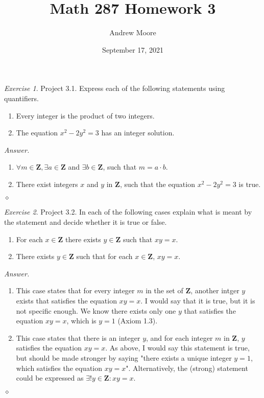 \documentclass[12pt,oneside]{amsart}
\title{Math 287 Homework 3}
\author{Andrew Moore}
\date{September 17, 2021} %
\theoremstyle{remark}
\newtheorem{exer}{Exercise}
\newcommand{\bfZ}{\mathbf{Z}}
\newenvironment{answer}{\bigskip\noindent\emph{Answer.}}{\hfill$\diamond$\newline}
\begin{document}
\maketitle

%
%
%
%

\newpage
\begin{exer}
Project 3.1. Express each of the following statements using quantifiers.
\begin{enumerate}[label={(\roman*)},start={3}]
\item Every integer is the product of two integers.
\item The equation $x^2-2y^2 = 3$ has an integer solution.
\end{enumerate}
\end{exer}

\begin{answer}
\begin{enumerate}[label={(\roman*)},start={3}]
\item $\forall m \in \bfZ, \exists a \in \bfZ$ and $\exists b \in \bfZ$, such that $m = a \cdot b$.
\item There exist integers $x$ and $y$ in $\bfZ$, such that the equation $x^2 - 2y^2 = 3$ is true.
\end{enumerate}
\end{answer}

%
%
%
%

\newpage
\begin{exer}
Project 3.2. In each of the following cases explain what is meant by the statement and decide whether it is true or false.
\begin{enumerate}[label={(\roman*)},start={3}]
\item For each $x \in \mathbf{Z}$ there exists $y \in \mathbf{Z}$ such that $xy=x$.
\item There exists $y \in \mathbf{Z}$ such that for each $x \in \mathbf{Z}$, $xy=x$.
\end{enumerate}
\end{exer}

\begin{answer}
\begin{enumerate}[label={(\roman*)},start={3}]
\item This case states that for every integer $m$ in the set of $\bfZ$, another intger $y$ exists that satisfies the equation $xy = x$. I would say that it is true, but it is not specific enough. We know there exists only one $y$ that satisfies the equation $xy = x$, which is $y = 1$ (Axiom 1.3).
\item This case states that there is an integer $y$, and for each integer $m$ in $\bfZ$, $y$ satisfies the equation $xy = x$. As above, I would say this statement is true, but should be made stronger by saying "there exists a unique integer $y = 1$, which satisfies the equation $xy = x$". Alternatively, the (strong) statement could be expressed as $\exists!y \in \bfZ \colon xy = x$.
\end{enumerate}
\end{answer}
\end{document}
